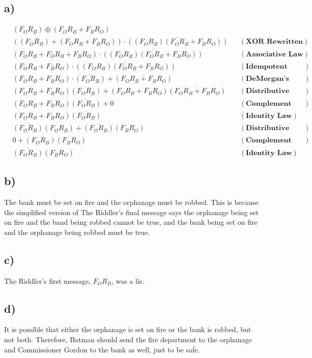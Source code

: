 \documentclass{article}
\begin{document}
\subsection*{a)}
\begin{align*}
    & (F_OR_B)\oplus(F_OR_B+F_BR_O) & & \\
    & ((F_OR_B)+(F_OR_B+F_BR_O))\cdot\overline{((F_OR_B)(F_OR_B+F_BR_O))} & &(\textbf{XOR Rewritten})\\
    & (F_OR_B+F_OR_B+F_BR_O)\cdot\overline{((F_OR_B)(F_OR_B+F_BR_O))} & &(\textbf{Associative Law})\\
    & (F_OR_B+F_BR_O)\cdot\overline{((F_OR_B)(F_OR_B+F_BR_O))} & &(\textbf{Idempotent Law})\\
    & (F_OR_B+F_BR_O)\cdot\overline{(F_OR_B)}+\overline{(F_OR_B+F_BR_O)}& &(\textbf{DeMorgan's Law})\\
    & (F_OR_B+F_BR_O)\overline{(F_OR_B)}+(F_OR_B+F_BR_O)\overline{(F_OR_B+F_BR_O)}& &(\textbf{Distributive Law})\\
    & (F_OR_B+F_BR_O)\overline{(F_OR_B)}+0& &(\textbf{Complement Law})\\
    & (F_OR_B+F_BR_O)\overline{(F_OR_B)}& &(\textbf{Identity Law})\\
    & \overline{(F_OR_B)}(F_OR_B)+\overline{(F_OR_B)}(F_BR_O)& &(\textbf{Distributive Law})\\
    & 0+\overline{(F_OR_B)}(F_BR_O)& &(\textbf{Complement Law})\\
    & \overline{(F_OR_B)}(F_BR_O)& &(\textbf{Identity Law})
\end{align*}
\subsection*{b)}
The bank must be set on fire and the orphanage must be robbed. This is because the simplified version of The Riddler's final message says the orphanage being set on fire and the band being robbed cannot be true, and the bank being set on fire and the orphanage being robbed must be true.
\subsection*{c)}
The Riddler's first message, $F_OR_B$, was a lie.
\subsection*{d)}
It is possible that either the orphanage is set on fire or the bank is robbed, but not both. Therefore, Batman should send the fire department to the orphanage and Commissioner Gordon to the bank as well, just to be safe.
\end{document}
